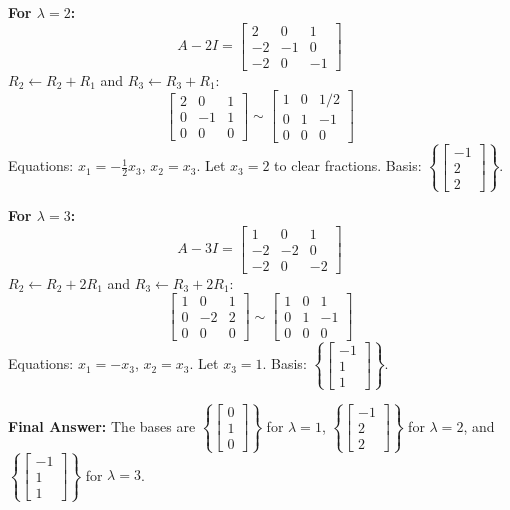 \documentclass[11pt, a4paper]{article}
\theoremstyle{definition}
\theoremstyle{remark}
\begin{document}
\textbf{For $\lambda = 2$:}
\[
A - 2I = \begin{bmatrix} 2 & 0 & 1 \\ -2 & -1 & 0 \\ -2 & 0 & -1 \end{bmatrix}
\]
$R_2 \leftarrow R_2 + R_1$ and $R_3 \leftarrow R_3 + R_1$:
\[
\begin{bmatrix} 2 & 0 & 1 \\ 0 & -1 & 1 \\ 0 & 0 & 0 \end{bmatrix} \sim \begin{bmatrix} 1 & 0 & 1/2 \\ 0 & 1 & -1 \\ 0 & 0 & 0 \end{bmatrix}
\]
Equations: $x_1 = -\frac{1}{2}x_3$, $x_2 = x_3$. Let $x_3 = 2$ to clear fractions. Basis: $\left\{ \begin{bmatrix} -1 \\ 2 \\ 2 \end{bmatrix} \right\}$.

\textbf{For $\lambda = 3$:}
\[
A - 3I = \begin{bmatrix} 1 & 0 & 1 \\ -2 & -2 & 0 \\ -2 & 0 & -2 \end{bmatrix}
\]
$R_2 \leftarrow R_2 + 2R_1$ and $R_3 \leftarrow R_3 + 2R_1$:
\[
\begin{bmatrix} 1 & 0 & 1 \\ 0 & -2 & 2 \\ 0 & 0 & 0 \end{bmatrix} \sim \begin{bmatrix} 1 & 0 & 1 \\ 0 & 1 & -1 \\ 0 & 0 & 0 \end{bmatrix}
\]
Equations: $x_1 = -x_3$, $x_2 = x_3$. Let $x_3 = 1$. Basis: $\left\{ \begin{bmatrix} -1 \\ 1 \\ 1 \end{bmatrix} \right\}$.

\textbf{Final Answer:} The bases are $\left\{ \begin{bmatrix} 0 \\ 1 \\ 0 \end{bmatrix} \right\}$ for $\lambda=1$, $\left\{ \begin{bmatrix} -1 \\ 2 \\ 2 \end{bmatrix} \right\}$ for $\lambda=2$, and $\left\{ \begin{bmatrix} -1 \\ 1 \\ 1 \end{bmatrix} \right\}$ for $\lambda=3$.
\end{document}
